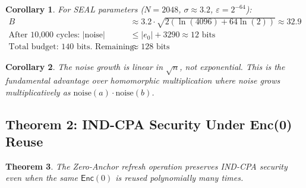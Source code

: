 \documentclass[11pt,a4paper]{article}
\newtheorem{theorem}{Theorem}[section]
\newtheorem{corollary}[theorem]{Corollary}
\begin{document}
\begin{corollary}
For SEAL parameters ($N=2048$, $\sigma \approx 3.2$, $\varepsilon = 2^{-64}$):
\begin{align*}
B &\approx 3.2 \cdot \sqrt{2(\ln(4096) + 64\ln(2))} \approx 32.9 \\
\text{After 10,000 cycles: } |\text{noise}| &\leq |e_0| + 3290 \approx 12 \text{ bits} \\
\text{Total budget: } 140 \text{ bits. Remaining: } &\approx 128 \text{ bits}
\end{align*}
\end{corollary}

\begin{corollary}
The noise growth is linear in $\sqrt{n}$, not exponential. This is the fundamental advantage over homomorphic multiplication where noise grows multiplicatively as $\text{noise}(a) \cdot \text{noise}(b)$.
\end{corollary}

\subsection{Theorem 2: IND-CPA Security Under Enc(0) Reuse}

\begin{theorem}
The Zero-Anchor refresh operation preserves IND-CPA security even when the same $\mathsf{Enc}(0)$ is reused polynomially many times.
\end{theorem}
\end{document}
